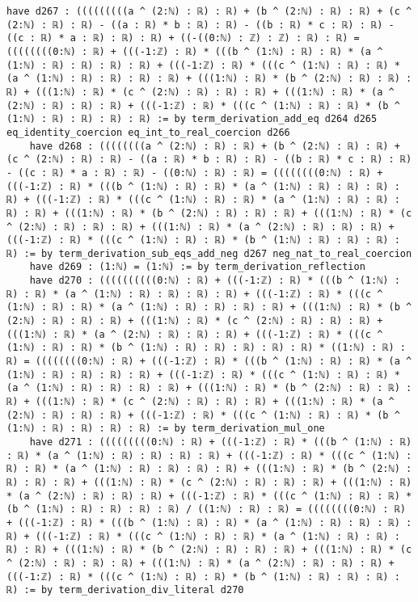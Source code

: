 \documentclass{article}
\begin{document}
\begin{tcolorbox}[colback=white!10, width=\linewidth]
\begin{lstlisting}[language=Lean4]
    have d267 : (((((((((a ^ (2:ℕ) : ℝ) : ℝ) + (b ^ (2:ℕ) : ℝ) : ℝ) + (c ^ (2:ℕ) : ℝ) : ℝ) - ((a : ℝ) * b : ℝ) : ℝ) - ((b : ℝ) * c : ℝ) : ℝ) - ((c : ℝ) * a : ℝ) : ℝ) : ℝ) + ((-((0:ℕ) : ℤ) : ℤ) : ℝ) : ℝ) = ((((((((0:ℕ) : ℝ) + (((-1:ℤ) : ℝ) * (((b ^ (1:ℕ) : ℝ) : ℝ) * (a ^ (1:ℕ) : ℝ) : ℝ) : ℝ) : ℝ) + (((-1:ℤ) : ℝ) * (((c ^ (1:ℕ) : ℝ) : ℝ) * (a ^ (1:ℕ) : ℝ) : ℝ) : ℝ) : ℝ) + (((1:ℕ) : ℝ) * (b ^ (2:ℕ) : ℝ) : ℝ) : ℝ) + (((1:ℕ) : ℝ) * (c ^ (2:ℕ) : ℝ) : ℝ) : ℝ) + (((1:ℕ) : ℝ) * (a ^ (2:ℕ) : ℝ) : ℝ) : ℝ) + (((-1:ℤ) : ℝ) * (((c ^ (1:ℕ) : ℝ) : ℝ) * (b ^ (1:ℕ) : ℝ) : ℝ) : ℝ) : ℝ) := by term_derivation_add_eq d264 d265 eq_identity_coercion eq_int_to_real_coercion d266
    have d268 : ((((((((a ^ (2:ℕ) : ℝ) : ℝ) + (b ^ (2:ℕ) : ℝ) : ℝ) + (c ^ (2:ℕ) : ℝ) : ℝ) - ((a : ℝ) * b : ℝ) : ℝ) - ((b : ℝ) * c : ℝ) : ℝ) - ((c : ℝ) * a : ℝ) : ℝ) - ((0:ℕ) : ℝ) : ℝ) = ((((((((0:ℕ) : ℝ) + (((-1:ℤ) : ℝ) * (((b ^ (1:ℕ) : ℝ) : ℝ) * (a ^ (1:ℕ) : ℝ) : ℝ) : ℝ) : ℝ) + (((-1:ℤ) : ℝ) * (((c ^ (1:ℕ) : ℝ) : ℝ) * (a ^ (1:ℕ) : ℝ) : ℝ) : ℝ) : ℝ) + (((1:ℕ) : ℝ) * (b ^ (2:ℕ) : ℝ) : ℝ) : ℝ) + (((1:ℕ) : ℝ) * (c ^ (2:ℕ) : ℝ) : ℝ) : ℝ) + (((1:ℕ) : ℝ) * (a ^ (2:ℕ) : ℝ) : ℝ) : ℝ) + (((-1:ℤ) : ℝ) * (((c ^ (1:ℕ) : ℝ) : ℝ) * (b ^ (1:ℕ) : ℝ) : ℝ) : ℝ) : ℝ) := by term_derivation_sub_eqs_add_neg d267 neg_nat_to_real_coercion
    have d269 : (1:ℕ) = (1:ℕ) := by term_derivation_reflection
    have d270 : ((((((((((0:ℕ) : ℝ) + (((-1:ℤ) : ℝ) * (((b ^ (1:ℕ) : ℝ) : ℝ) * (a ^ (1:ℕ) : ℝ) : ℝ) : ℝ) : ℝ) + (((-1:ℤ) : ℝ) * (((c ^ (1:ℕ) : ℝ) : ℝ) * (a ^ (1:ℕ) : ℝ) : ℝ) : ℝ) : ℝ) + (((1:ℕ) : ℝ) * (b ^ (2:ℕ) : ℝ) : ℝ) : ℝ) + (((1:ℕ) : ℝ) * (c ^ (2:ℕ) : ℝ) : ℝ) : ℝ) + (((1:ℕ) : ℝ) * (a ^ (2:ℕ) : ℝ) : ℝ) : ℝ) + (((-1:ℤ) : ℝ) * (((c ^ (1:ℕ) : ℝ) : ℝ) * (b ^ (1:ℕ) : ℝ) : ℝ) : ℝ) : ℝ) : ℝ) * ((1:ℕ) : ℝ) : ℝ) = ((((((((0:ℕ) : ℝ) + (((-1:ℤ) : ℝ) * (((b ^ (1:ℕ) : ℝ) : ℝ) * (a ^ (1:ℕ) : ℝ) : ℝ) : ℝ) : ℝ) + (((-1:ℤ) : ℝ) * (((c ^ (1:ℕ) : ℝ) : ℝ) * (a ^ (1:ℕ) : ℝ) : ℝ) : ℝ) : ℝ) + (((1:ℕ) : ℝ) * (b ^ (2:ℕ) : ℝ) : ℝ) : ℝ) + (((1:ℕ) : ℝ) * (c ^ (2:ℕ) : ℝ) : ℝ) : ℝ) + (((1:ℕ) : ℝ) * (a ^ (2:ℕ) : ℝ) : ℝ) : ℝ) + (((-1:ℤ) : ℝ) * (((c ^ (1:ℕ) : ℝ) : ℝ) * (b ^ (1:ℕ) : ℝ) : ℝ) : ℝ) : ℝ) := by term_derivation_mul_one
    have d271 : (((((((((0:ℕ) : ℝ) + (((-1:ℤ) : ℝ) * (((b ^ (1:ℕ) : ℝ) : ℝ) * (a ^ (1:ℕ) : ℝ) : ℝ) : ℝ) : ℝ) + (((-1:ℤ) : ℝ) * (((c ^ (1:ℕ) : ℝ) : ℝ) * (a ^ (1:ℕ) : ℝ) : ℝ) : ℝ) : ℝ) + (((1:ℕ) : ℝ) * (b ^ (2:ℕ) : ℝ) : ℝ) : ℝ) + (((1:ℕ) : ℝ) * (c ^ (2:ℕ) : ℝ) : ℝ) : ℝ) + (((1:ℕ) : ℝ) * (a ^ (2:ℕ) : ℝ) : ℝ) : ℝ) + (((-1:ℤ) : ℝ) * (((c ^ (1:ℕ) : ℝ) : ℝ) * (b ^ (1:ℕ) : ℝ) : ℝ) : ℝ) : ℝ) / ((1:ℕ) : ℝ) : ℝ) = ((((((((0:ℕ) : ℝ) + (((-1:ℤ) : ℝ) * (((b ^ (1:ℕ) : ℝ) : ℝ) * (a ^ (1:ℕ) : ℝ) : ℝ) : ℝ) : ℝ) + (((-1:ℤ) : ℝ) * (((c ^ (1:ℕ) : ℝ) : ℝ) * (a ^ (1:ℕ) : ℝ) : ℝ) : ℝ) : ℝ) + (((1:ℕ) : ℝ) * (b ^ (2:ℕ) : ℝ) : ℝ) : ℝ) + (((1:ℕ) : ℝ) * (c ^ (2:ℕ) : ℝ) : ℝ) : ℝ) + (((1:ℕ) : ℝ) * (a ^ (2:ℕ) : ℝ) : ℝ) : ℝ) + (((-1:ℤ) : ℝ) * (((c ^ (1:ℕ) : ℝ) : ℝ) * (b ^ (1:ℕ) : ℝ) : ℝ) : ℝ) : ℝ) := by term_derivation_div_literal d270

\end{lstlisting}
\end{tcolorbox}
\end{document}
